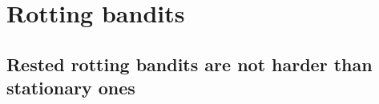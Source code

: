 \part{Rotting bandits}

\chapter{Rested rotting bandits are not harder than stationary ones}








